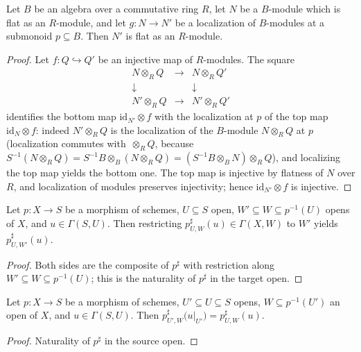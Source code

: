 \begin{lemma}
  \leanok
  \label{lem:flat_localizedModule_algebra}
  Let \(B\) be an algebra over a commutative ring \(R\), let \(N\) be a
  \(B\)-module which is flat as an \(R\)-module, and let
  \(g : N \to N'\) be a localization of \(B\)-modules at a submonoid
  \(p \subseteq B\). Then \(N'\) is flat as an \(R\)-module.
\end{lemma}
\begin{proof}
  \leanok
  Let \(f : Q \hookrightarrow Q'\) be an injective map of \(R\)-modules. The
  square
  \[
    \begin{array}{ccc}
      N \otimes_R Q & \longrightarrow & N \otimes_R Q' \\
      \downarrow & & \downarrow \\
      N' \otimes_R Q & \longrightarrow & N' \otimes_R Q'
    \end{array}
  \]
  identifies the bottom map \(\mathrm{id}_{N'} \otimes f\) with the
  localization at \(p\) of the top map \(\mathrm{id}_N \otimes f\): indeed
  \(N' \otimes_R Q\) is the localization of the \(B\)-module
  \(N \otimes_R Q\) at \(p\) (localization commutes with \(\, \otimes_R Q\),
  because \(S^{-1}(N \otimes_R Q) = S^{-1}B \otimes_B (N \otimes_R Q)
  = (S^{-1}B \otimes_B N) \otimes_R Q\)), and localizing the top map yields
  the bottom one. The top map is injective by flatness of \(N\) over \(R\),
  and localization of modules preserves injectivity; hence
  \(\mathrm{id}_{N'} \otimes f\) is injective.
\end{proof}

\begin{lemma}
  \leanok
  \label{lem:appLE_res_apply}
  Let \(p : X \to S\) be a morphism of schemes, \(U \subseteq S\) open,
  \(W' \subseteq W \subseteq p^{-1}(U)\) opens of \(X\), and
  \(u \in \Gamma(S, U)\). Then restricting
  \(p^\sharp_{U,W}(u) \in \Gamma(X, W)\) to \(W'\) yields
  \(p^\sharp_{U,W'}(u)\).
\end{lemma}
\begin{proof}
  \leanok
  Both sides are the composite of \(p^\sharp\) with restriction along
  \(W' \subseteq W \subseteq p^{-1}(U)\); this is the naturality of
  \(p^\sharp\) in the target open.
\end{proof}

\begin{lemma}
  \leanok
  \label{lem:appLE_base_res_apply}
  Let \(p : X \to S\) be a morphism of schemes, \(U' \subseteq U \subseteq S\)
  opens, \(W \subseteq p^{-1}(U')\) an open of \(X\), and
  \(u \in \Gamma(S, U)\). Then
  \(p^\sharp_{U',W}\bigl(u|_{U'}\bigr) = p^\sharp_{U,W}(u)\).
\end{lemma}
\begin{proof}
  \leanok
  Naturality of \(p^\sharp\) in the source open.
\end{proof}

